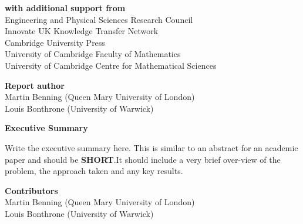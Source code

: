 \documentclass[12pt]{article}
\begin{document}
\begin{center}
\textbf{with additional support from}\\
Engineering and Physical Sciences Research Council\\
Innovate UK Knowledge Transfer Network\\
Cambridge University Press\\
University of Cambridge Faculty of Mathematics\\
University of Cambridge Centre for Mathematical Sciences
\end{center}
\newpage
\begin{center}
    \large\textbf{Report author}\\ %
   \vskip1cm
    \normalsize Martin Benning (Queen Mary University of London) \\
    \normalsize Louis Bonthrone (University of Warwick)\\
\end{center}
\vskip2cm
\begin{center}
    \textbf{Executive Summary}
\end{center}
Write the executive summary here. This is similar to an abstract for an academic paper and should be \textbf{SHORT}.It should include a very brief over-view of the problem, the approach taken and any key results.
\newpage
\begin{center}
    \large\textbf{Contributors}\\
    \vskip1cm
    \normalsize Martin Benning (Queen Mary University of London)\\
    \normalsize Louis Bonthrone (University of Warwick)\\
\end{center}
\newpage

\tableofcontents
\newpage
\end{document}
